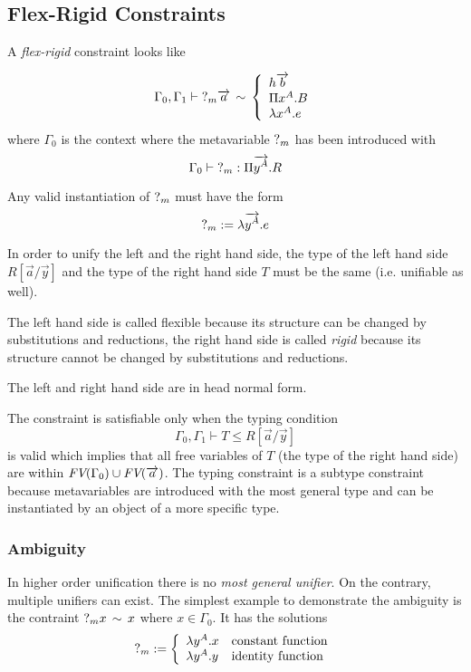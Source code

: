 \subsection{Flex-Rigid Constraints}

A \emph{flex-rigid} constraint looks like

$$
%
    \Gamma_0, \Gamma_1
%
    \vdash
%
    \meta m \vec a
%
    \equiv
%
    \cases {
        h \vec b
        \\
        \Pi x^A. B
        \\
        \lambda x^A. e
    }
$$
%
where $\Gamma_0$ is the context where the metavariable ${?_{m}}$ has been
introduced with
$$
    \Gamma_0 \vdash {?_{m}} : \Pi {\overrightarrow {y^A}}. R
$$

Any valid instantiation of ${?_{m}}$ must have the form
$$
    {?_{m}} := \lambda {\overrightarrow {y^A}}. e
$$

In order to unify the left and the right hand side, the type of the left hand
side $R[\vec a/ \vec y]$ and the type of the right hand side $T$ must be the same
(i.e. unifiable as well).

The left hand side is called flexible because its structure can be changed by
substitutions and reductions, the right hand side is called \emph{rigid} because
its structure cannot be changed by substitutions and reductions.

The left and right hand side are in head normal form.


The constraint is satisfiable only when the typing condition
$$
    \Gamma_0, \Gamma_1 \vdash T \le R[\vec a / \vec y]
$$
is valid which implies that all free variables of $T$ (the type of the right
hand side) are within ${\text{\it FV}}(\Gamma_0) \cup {\text{\it FV}}({\overrightarrow {a}})$. The typing constraint is a
subtype constraint because metavariables are introduced with the most general
type and can be instantiated by an object of a more specific type.



\subsubsection{Ambiguity}
In higher order unification there is no \emph{most general unifier}. On the
contrary, multiple unifiers can exist. The simplest example to demonstrate the
ambiguity is the contraint ${?_{m}} x \, \sim \, x$ where $x \in \Gamma_0$. It has
the solutions
$$
    {?_{m}} := \left\{ \begin{array}{lllll} 
        \lambda y^A. x & \text{constant function}
        \\
        \lambda y^A. y & \text{identity function}
     \end{array} \right.
$$

